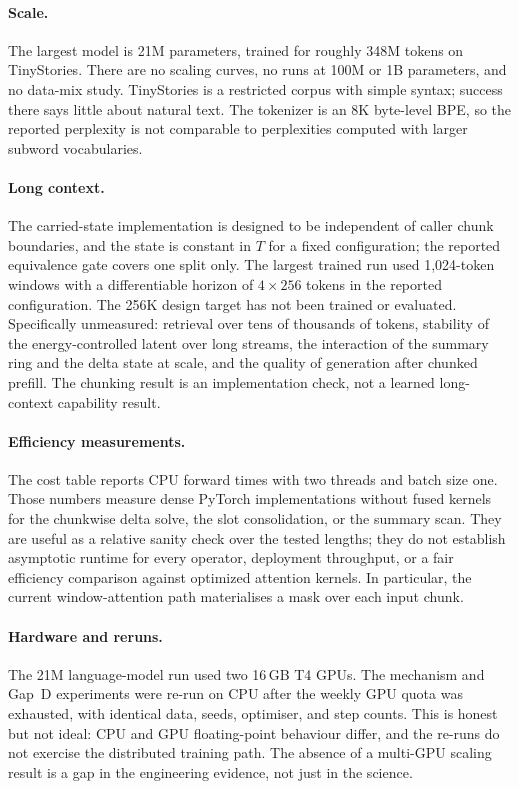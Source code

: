 \paragraph{Scale.}
The largest model is 21M parameters, trained for roughly 348M tokens on TinyStories. There are
no scaling curves, no runs at 100M or 1B parameters, and no data-mix study. TinyStories is a
restricted corpus with simple syntax; success there says little about natural text. The
tokenizer is an 8K byte-level BPE, so the reported perplexity is not comparable to perplexities
computed with larger subword vocabularies.

\paragraph{Long context.}
The carried-state implementation is designed to be independent of caller chunk boundaries, and
the state is constant in $T$ for a fixed configuration; the reported equivalence gate covers one
split only. The largest trained run used 1{,}024-token windows with a differentiable horizon of
$4\times256$ tokens in the reported configuration. The 256K design target has not been trained
or evaluated. Specifically unmeasured: retrieval over tens of thousands of tokens, stability of
the energy-controlled latent over long streams, the interaction of the summary ring and the
delta state at scale, and the quality of generation after chunked prefill. The chunking result
is an implementation check, not a learned long-context capability result.

\paragraph{Efficiency measurements.}
The cost table reports CPU forward times with two threads and batch size one. Those numbers
measure dense PyTorch implementations without fused kernels for the chunkwise delta solve, the
slot consolidation, or the summary scan. They are useful as a relative sanity check over the
tested lengths; they do not establish asymptotic runtime for every operator, deployment
throughput, or a fair efficiency comparison against optimized attention kernels. In particular,
the current window-attention path materialises a mask over each input chunk.

\paragraph{Hardware and reruns.}
The 21M language-model run used two 16\,GB T4 GPUs. The mechanism and Gap~D experiments were
re-run on CPU after the weekly GPU quota was exhausted, with identical data, seeds, optimiser,
and step counts. This is honest but not ideal: CPU and GPU floating-point behaviour differ, and
the re-runs do not exercise the distributed training path. The absence of a multi-GPU scaling
result is a gap in the engineering evidence, not just in the science.

